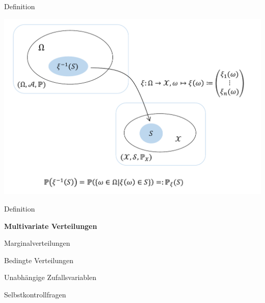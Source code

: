 \documentclass[
  8pt,
  ignorenonframetext,
]{beamer}
\begin{document}
\begin{frame}{Definition}
\protect\hypertarget{definition-1}{}
\vspace{.2cm}
\center

\begin{center}\includegraphics[width=1\linewidth]{5_Abbildungen/wtfi_5_zufallsvektor} \end{center}
\end{frame}

\begin{frame}{}
\protect\hypertarget{section-6}{}
\large
{}
\vfill

Definition

\textbf{Multivariate Verteilungen}

Marginalverteilungen

Bedingte Verteilungen

Unabhängige Zufallsvariablen

Selbstkontrollfragen

\vfill
\end{frame}
\end{document}
